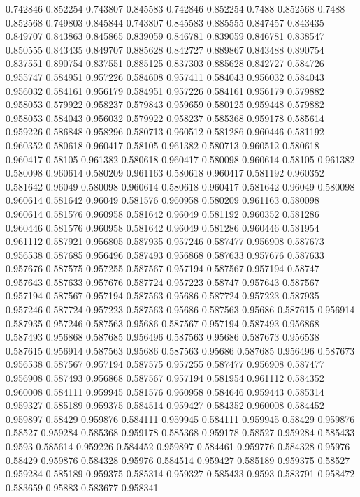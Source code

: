 0.742846 0.852254
0.743807 0.845583
0.742846 0.852254
0.7488 0.852568
0.7488 0.852568
0.749803 0.845844
0.743807 0.845583
0.885555 0.847457
0.843435 0.849707
0.843863 0.845865
0.839059 0.846781
0.839059 0.846781
0.838547 0.850555
0.843435 0.849707
0.885628 0.842727
0.889867 0.843488
0.890754 0.837551
0.890754 0.837551
0.885125 0.837303
0.885628 0.842727
0.584726 0.955747
0.584951 0.957226
0.584608 0.957411
0.584043 0.956032
0.584043 0.956032
0.584161 0.956179
0.584951 0.957226
0.584161 0.956179
0.579882 0.958053
0.579922 0.958237
0.579843 0.959659
0.580125 0.959448
0.579882 0.958053
0.584043 0.956032
0.579922 0.958237
0.585368 0.959178
0.585614 0.959226
0.586848 0.958296
0.580713 0.960512
0.581286 0.960446
0.581192 0.960352
0.580618 0.960417
0.58105 0.961382
0.580713 0.960512
0.580618 0.960417
0.58105 0.961382
0.580618 0.960417
0.580098 0.960614
0.58105 0.961382
0.580098 0.960614
0.580209 0.961163
0.580618 0.960417
0.581192 0.960352
0.581642 0.96049
0.580098 0.960614
0.580618 0.960417
0.581642 0.96049
0.580098 0.960614
0.581642 0.96049
0.581576 0.960958
0.580209 0.961163
0.580098 0.960614
0.581576 0.960958
0.581642 0.96049
0.581192 0.960352
0.581286 0.960446
0.581576 0.960958
0.581642 0.96049
0.581286 0.960446
0.581954 0.961112
0.587921 0.956805
0.587935 0.957246
0.587477 0.956908
0.587673 0.956538
0.587685 0.956496
0.587493 0.956868
0.587633 0.957676
0.587633 0.957676
0.587575 0.957255
0.587567 0.957194
0.587567 0.957194
0.58747 0.957643
0.587633 0.957676
0.587724 0.957223
0.58747 0.957643
0.587567 0.957194
0.587567 0.957194
0.587563 0.95686
0.587724 0.957223
0.587935 0.957246
0.587724 0.957223
0.587563 0.95686
0.587563 0.95686
0.587615 0.956914
0.587935 0.957246
0.587563 0.95686
0.587567 0.957194
0.587493 0.956868
0.587493 0.956868
0.587685 0.956496
0.587563 0.95686
0.587673 0.956538
0.587615 0.956914
0.587563 0.95686
0.587563 0.95686
0.587685 0.956496
0.587673 0.956538
0.587567 0.957194
0.587575 0.957255
0.587477 0.956908
0.587477 0.956908
0.587493 0.956868
0.587567 0.957194
0.581954 0.961112
0.584352 0.960008
0.584111 0.959945
0.581576 0.960958
0.584646 0.959443
0.585314 0.959327
0.585189 0.959375
0.584514 0.959427
0.584352 0.960008
0.584452 0.959897
0.58429 0.959876
0.584111 0.959945
0.584111 0.959945
0.58429 0.959876
0.58527 0.959284
0.585368 0.959178
0.585368 0.959178
0.58527 0.959284
0.585433 0.9593
0.585614 0.959226
0.584452 0.959897
0.584461 0.959776
0.584328 0.95976
0.58429 0.959876
0.584328 0.95976
0.584514 0.959427
0.585189 0.959375
0.58527 0.959284
0.585189 0.959375
0.585314 0.959327
0.585433 0.9593
0.583791 0.958472
0.583659 0.95883
0.583677 0.958341

